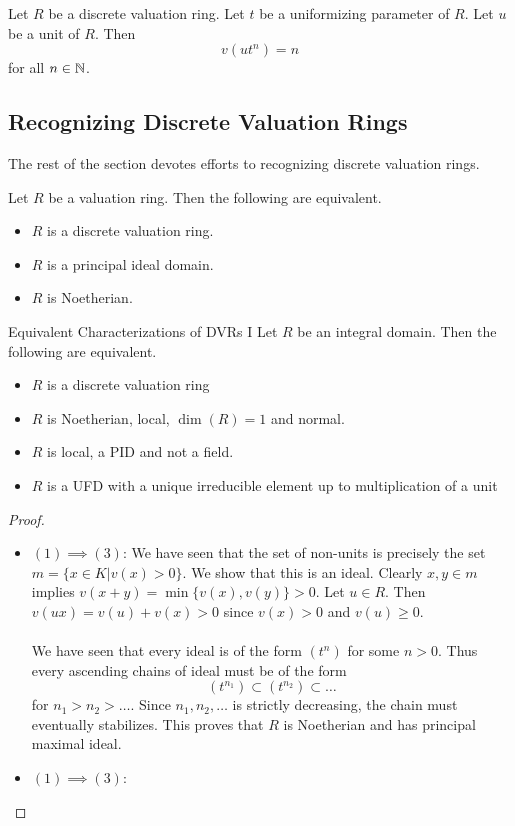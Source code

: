 \documentclass[a4paper]{article}
\begin{document}
\begin{prp}{}{} Let $R$ be a discrete valuation ring. Let $t$ be a uniformizing parameter of $R$. Let $u$ be a unit of $R$. Then $$v(ut^n)=n$$ for all $n\in\mathbb{N}$. 
\end{prp}

\subsection{Recognizing Discrete Valuation Rings}
The rest of the section devotes efforts to recognizing discrete valuation rings. 

\begin{prp}{}{} Let $R$ be a valuation ring. Then the following are equivalent. 
\begin{itemize}
\item $R$ is a discrete valuation ring. 
\item $R$ is a principal ideal domain. 
\item $R$ is Noetherian. 
\end{itemize}
\end{prp}

\begin{prp}{Equivalent Characterizations of DVRs I}{} Let $R$ be an integral domain. Then the following are equivalent. 
\begin{itemize}
\item $R$ is a discrete valuation ring
\item $R$ is Noetherian, local, $\dim(R)=1$ and normal. 
\item $R$ is local, a PID and not a field. 
\item $R$ is a UFD with a unique irreducible element up to multiplication of a unit
\end{itemize} \tcbline
\begin{proof}~\\
\begin{itemize}
\item $(1)\implies(3)$: We have seen that the set of non-units is precisely the set $m=\{x\in K|v(x)>0\}$. We show that this is an ideal. Clearly $x,y\in m$ implies $v(x+y)=\min\{v(x),v(y)\}>0$. Let $u\in R$. Then $v(ux)=v(u)+v(x)>0$ since $v(x)>0$ and $v(u)\geq 0$. \\~\\
We have seen that every ideal is of the form $(t^n)$ for some $n>0$. Thus every ascending chains of ideal must be of the form $$(t^{n_1})\subset(t^{n_2})\subset\dots$$ for $n_1>n_2>\dots$. Since $n_1,n_2,\dots$ is strictly decreasing, the chain must eventually stabilizes. This proves that $R$ is Noetherian and has principal maximal ideal. 
\item $(1)\implies(3)$:
\end{itemize}
\end{proof}
\end{prp}
\end{document}

